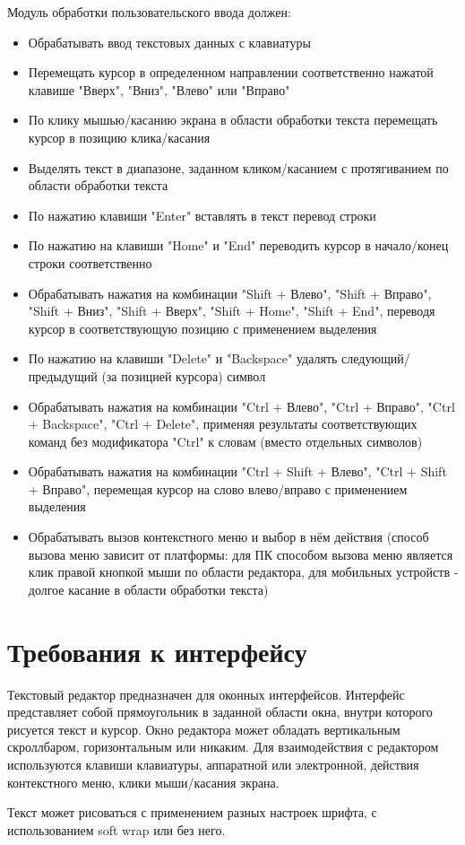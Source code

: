\documentclass{fefu}
\begin{document}
		\par Модуль обработки пользовательского ввода должен:
		\begin{itemize}
			\item Обрабатывать ввод текстовых данных с клавиатуры
			\item Перемещать курсор в определенном направлении соответственно нажатой 
			клавише "Вверх", "Вниз", "Влево" или "Вправо"
			\item По клику мышью/касанию экрана в области обработки текста перемещать курсор
			в позицию клика/касания
			\item Выделять текст в диапазоне, заданном кликом/касанием с протягиванием по
			области обработки текста
			\item По нажатию клавиши "Enter" вставлять в текст перевод строки
			\item По нажатию на клавиши "Home" и "End" переводить курсор в начало/конец строки
			соответственно
			\item Обрабатывать нажатия на комбинации "Shift + Влево", "Shift + Вправо", 
			"Shift + Вниз", "Shift + Вверх", "Shift + Home", "Shift + End", переводя курсор
			в соответствующую позицию с применением выделения
			\item По нажатию на клавиши "Delete" и "Backspace" удалять следующий/предыдущий
			(за позицией курсора) символ
			\item Обрабатывать нажатия на комбинации "Ctrl + Влево", "Ctrl + Вправо", 
			"Ctrl + Backspace", "Ctrl + Delete", применяя результаты соответствующих команд без
			модификатора "Ctrl" к словам (вместо отдельных символов)
			\item Обрабатывать нажатия на комбинации "Ctrl + Shift + Влево", 
			"Ctrl + Shift + Вправо", перемещая курсор на слово влево/вправо с применением
			выделения
			\item Обрабатывать вызов контекстного меню и выбор в нём действия (способ вызова
			меню зависит от платформы: для ПК способом вызова меню является клик правой
			кнопкой мыши по области редактора, для мобильных устройств - долгое касание в 
			области обработки текста)
		\end{itemize}
	\section{Требования к интерфейсу}
		\par Текстовый редактор предназначен для оконных интерфейсов. Интерфейс представляет
		собой прямоугольник в заданной области окна, внутри которого рисуется текст и курсор. Окно редактора может обладать 
		вертикальным скроллбаром, горизонтальным или никаким. Для взаимодействия с редактором
		используются клавиши клавиатуры, 
		аппаратной или электронной, действия контекстного меню, клики мыши/касания экрана.
		\par Текст может рисоваться с применением разных настроек шрифта, с использованием soft
		wrap или без него.
\end{document}
